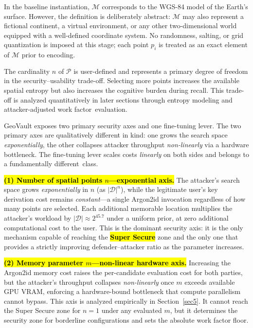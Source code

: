 \documentclass[mathematics,article,accept,pdftex,moreauthors]{Definitions/mdpi}
\begin{document}
In the baseline instantiation, $\mathcal{M}$ corresponds to the WGS-84 model of the Earth’s surface. However, the definition is deliberately abstract: $\mathcal{M}$ may also represent a fictional continent, a virtual environment, or any other two-dimensional world equipped with a well-defined coordinate system. No randomness, salting, or grid quantization is imposed at this stage; each point $p_i$ is treated as an exact element of $\mathcal{M}$ prior to encoding.

The cardinality $n$ of $\mathcal{P}$ is user-defined and represents a primary degree of freedom in the security--usability trade-off. Selecting more points increases the available spatial entropy but also increases the cognitive burden during recall. This trade-off is analyzed quantitatively in later sections through entropy modeling and attacker-adjusted work \mbox{factor evaluation.}

{GeoVault exposes two primary security axes and one fine-tuning lever. The two primary axes are qualitatively different in kind: one grows the search space \emph{exponentially}, the other collapses attacker throughput \emph{non-linearly} via a hardware bottleneck. The fine-tuning lever scales costs \emph{linearly} on both sides and belongs to a fundamentally different~class.}

{\textbf{\hl{(1) Number of spatial points $n$---exponential axis.} %
} The attacker's search space grows \emph{exponentially} in $n$ (as $|\mathcal{D}|^n$), while the legitimate user's key derivation cost remains \emph{constant}---a single Argon2id invocation regardless of how many points are selected. Each additional memorable location multiplies the attacker's workload by $|\mathcal{D}| \approx 2^{45.7}$ under a uniform prior, at zero additional computational cost to the user. This is the dominant security axis: it is the only mechanism capable of reaching the \textbf{\hl{Super Secure}} zone and the only one that provides a strictly improving defender--attacker ratio as the parameter increases.}

{\textbf{\hl{(2) Memory parameter $m$---non-linear hardware axis.}} Increasing the Argon2id memory cost raises the per-candidate evaluation cost for both parties, but the attacker's throughput collapses \emph{non-linearly} once $m$ exceeds available GPU VRAM, enforcing a hardware-bound bottleneck that compute parallelism cannot bypass. This axis is analyzed empirically in Section~\ref{sec5}. It cannot reach the Super Secure zone for $n=1$ under any evaluated $m$, but it determines the security zone for borderline configurations and sets the absolute work factor floor.}
\end{document}
